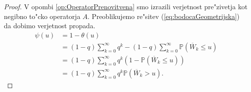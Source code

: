 \documentclass[12pt, a4paper, reqno]{amsart}
\theoremstyle{definition}
\theoremstyle{plain}
\newcommand{\Prob}{\mathbb{P}}
\newcommand{\1}{\mathds{1}}
\begin{document}
        \begin{proof}
            V opombi \ref{op:OperatorPrenovitvena} smo izrazili verjetnost pre"zivetja kot negibno to"cko 
            operatorja $A$. Preoblikujemo re"sitev (\ref{eq:bodocaGeometrijska}) da dobimo verjetnost propada. 
            \begin{align*}
                \psi(u) &= 1 - \theta(u)\\
                        &= (1 - q)\sum_{k = 0}^\infty q^k - (1 - q)\sum_{k = 0}^\infty \Prob\left(\overline{W}_k \leq u\right) \\
                        &= (1 - q)\sum_{k = 0}^\infty q^k\left(1 - \Prob\left(\overline{W}_k \leq u\right) \right)\\
                        &= (1 - q)\sum_{k = 0}^\infty q^k \Prob\left(\overline{W}_k > u\right).
            \end{align*}


\end{proof}
\end{document}
